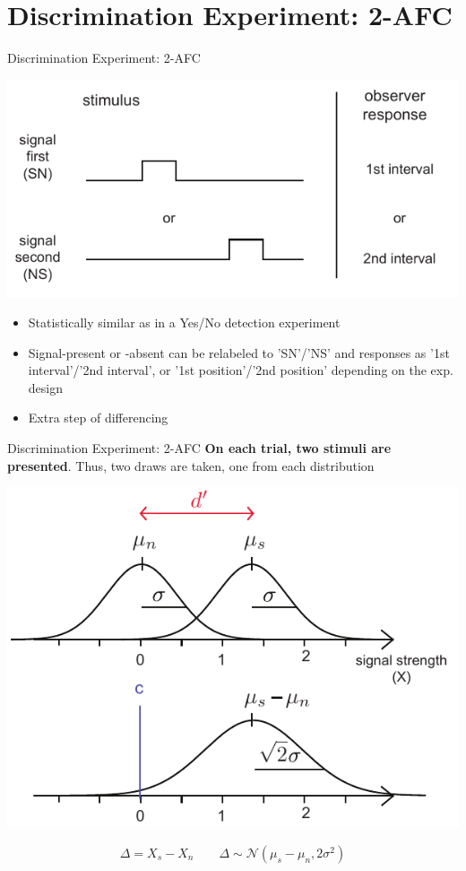 \documentclass[10pt]{beamer}
\begin{document}
\section{Discrimination Experiment: 2-AFC}
\begin{frame}{Discrimination Experiment: 2-AFC}

\begin{center}
\includegraphics[scale=0.75]{figs/2afc_design.pdf}
\end{center}

\begin{itemize}
\item Statistically similar as in a Yes/No detection experiment
\item Signal-present or -absent can be relabeled to 'SN'/'NS'
and responses as '1st interval'/'2nd interval', or  '1st position'/'2nd position'
depending on the exp. design
\item Extra step of differencing
\end{itemize}
\end{frame}


\begin{frame}{Discrimination Experiment: 2-AFC}
\textbf{On each trial, two stimuli are presented}. Thus, two draws are taken, one from each distribution

\begin{center}
\includegraphics[scale=0.7]{figs/2afc.pdf}
\end{center}

$$
\Delta = X_s - X_n \quad \quad \Delta \sim \mathcal{N} (\mu_s - \mu_n, 2\sigma^2)
$$

\end{frame}
\end{document}
